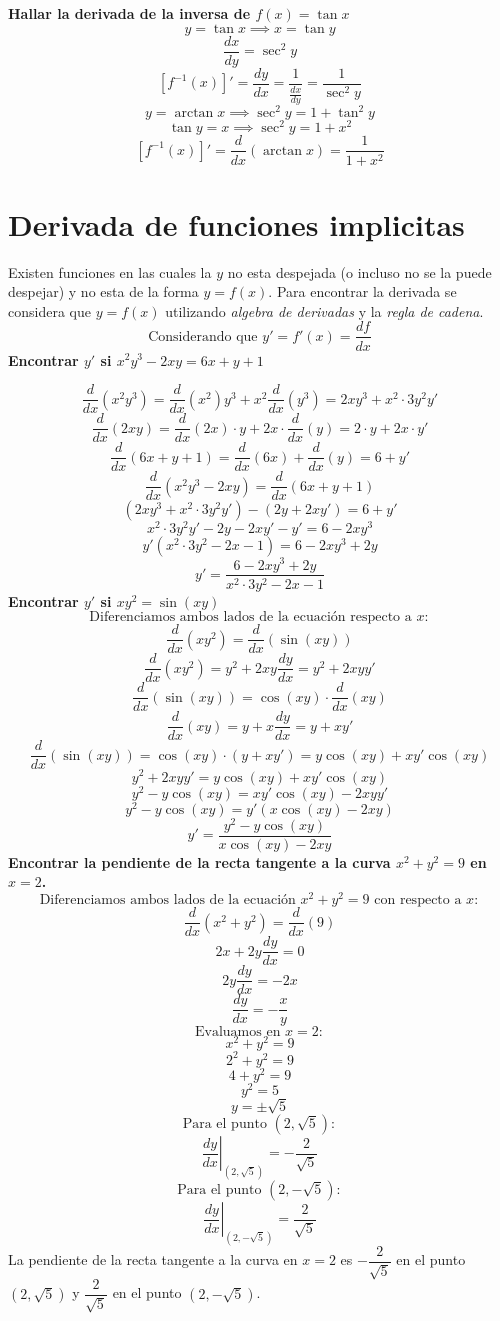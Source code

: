 \documentclass[12pt,a4paper,fleqn]{article}
\begin{document}
\noindent\textbf{Hallar la derivada de la inversa de \( f(x) = \tan x \)}
\[
	y = \tan x \implies x = \tan y
\]
\[
	\frac{dx}{dy} = \sec^2 y
\]
\[
	\left[f^{-1}(x)\right]' = \frac{dy}{dx} = \frac{1}{\frac{dx}{dy}} = \frac{1}{\sec^2 y}
\]
\[
	y = \arctan x \implies \sec^2 y = 1 + \tan^2 y
\]
\[
	\tan y = x \implies \sec^2 y = 1 + x^2
\]
\[
	\left[f^{-1}(x)\right]'=\frac{d}{dx} (\arctan x) = \frac{1}{1 + x^2}
\]



\section{Derivada de funciones implicitas }
Existen funciones en las cuales la $y$ no esta despejada (o incluso no se la puede despejar) y no esta de la forma $y = f(x)$.
Para encontrar la derivada se considera que $y =f(x)$ utilizando
\textit{algebra de derivadas} y la \textit{regla de cadena}.
\[
	\text{Considerando que } y'=f'(x)=\dfrac{df}{dx}
\]
\textbf{Encontrar \(y'\) si \(x^2y^3-2xy=6x+y+1\)}

\[
	\frac{d}{dx}(x^2y^3) = \frac{d}{dx}(x^2)y^3 + x^2\frac{d}{dx}(y^3) = 2xy^3 + x^2\cdot3y^2y'
\]
\[
	\frac{d}{dx}(2xy) = \frac{d}{dx}(2x)\cdot y + 2x \cdot \frac{d}{dx}(y) = 2\cdot y + 2x\cdot y'
\]
\[
	\frac{d}{dx}(6x+y+1) = \frac{d}{dx}(6x)+\frac{d}{dx}(y)  = 6+y'
\]
\[
	\frac{d}{dx}(x^2y^3-2xy)= \frac{d}{dx}(6x+y+1)
\]
\[
	(2xy^3 + x^2\cdot3y^2y') - (2y + 2xy') = 6+y'
\]
\[
	x^2\cdot3y^2y' - 2y - 2xy' -y' = 6 - 2xy^3
\]
\[
	y'(x^2\cdot3y^2- 2x -1) = 6 - 2xy^3 + 2y
\]
\[
	y'= \dfrac{6 - 2xy^3 + 2y}{x^2\cdot3y^2  - 2x - 1}
\]
\noindent\textbf{Encontrar \( y' \) si \( xy^2 = \sin(xy) \)}
\[
    \text{Diferenciamos ambos lados de la ecuación respecto a } x:
\]
\[
    \frac{d}{dx}(xy^2) = \frac{d}{dx}(\sin(xy))
\]
\[
    \frac{d}{dx}(xy^2) = y^2 + 2xy \frac{dy}{dx} = y^2 + 2xy y'
\]
\[
    \frac{d}{dx}(\sin(xy)) = \cos(xy) \cdot \frac{d}{dx}(xy)
\]
\[
    \frac{d}{dx}(xy) = y + x \frac{dy}{dx} = y + x y'
\]
\[
    \frac{d}{dx}(\sin(xy)) = \cos(xy) \cdot (y + x y') = y \cos(xy) + x y' \cos(xy)
\]
\[
    y^2 + 2xy y' = y \cos(xy) + x y' \cos(xy)
\]
\[
    y^2 - y \cos(xy) = x y' \cos(xy) - 2xy y'
\]
\[
    y^2 - y \cos(xy) = y' (x \cos(xy) - 2xy)
\]
\[
    y' = \frac{y^2 - y \cos(xy)}{x \cos(xy) - 2xy}
\]
\noindent\textbf{Encontrar la pendiente de la recta tangente a la curva \( x^2 + y^2 = 9 \) en \( x = 2 \).}
\[
    \text{Diferenciamos ambos lados de la ecuación } x^2 + y^2 = 9 \text{ con respecto a } x:
\]
\[
    \frac{d}{dx}(x^2 + y^2) = \frac{d}{dx}(9)
\]
\[
    2x + 2y \frac{dy}{dx} = 0
\]
\[
    2y \frac{dy}{dx} = -2x
\]
\[
    \frac{dy}{dx} = -\frac{x}{y}
\]
\[
    \text{Evaluamos en } x = 2:
\]
\[
    x^2 + y^2 = 9
\]
\[
    2^2 + y^2 = 9
\]
\[
    4 + y^2 = 9
\]
\[
    y^2 = 5
\]
\[
    y = \pm \sqrt{5}
\]
\[
    \text{Para el punto } (2, \sqrt{5}):
\]
\[
    \left. \frac{dy}{dx} \right|_{(2, \sqrt{5})} = -\frac{2}{\sqrt{5}}
\]
\[
    \text{Para el punto } (2, -\sqrt{5}):
\]
\[
    \left. \frac{dy}{dx} \right|_{(2, -\sqrt{5})} = \frac{2}{\sqrt{5}}
\]
La pendiente de la recta tangente a la curva en  $x = 2$  es  $-\dfrac{2}{\sqrt{5}}$  en el punto  $(2, \sqrt{5})$  y  $\dfrac{2}{\sqrt{5}}$  en el punto  $(2, -\sqrt{5})$.
\end{document}
